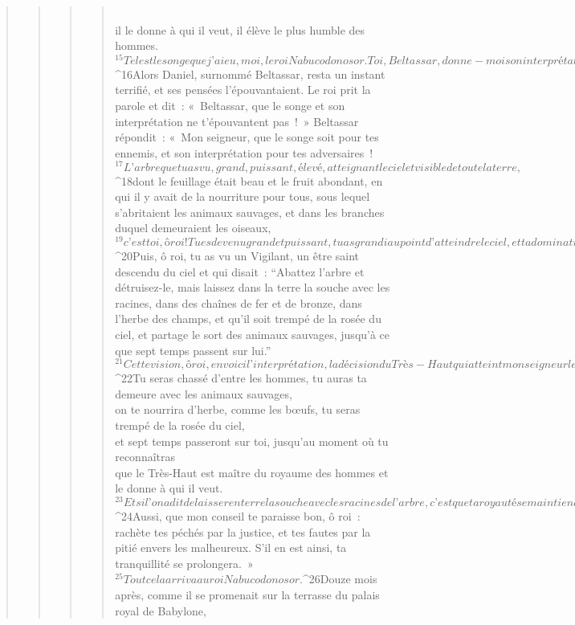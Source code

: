 \begin{verse}
\begin{verse}
\begin{verse}
\begin{verse}
        \\il le donne à qui il veut,
        il élève le plus humble des hommes.
${}^{15}Tel est le songe que j’ai eu, moi, le roi Nabucodonosor. Toi, Beltassar, donne-moi son interprétation, car aucun des sages de mon royaume n’a pu m’en faire connaître l’interprétation. Mais toi, tu le peux, puisque l’esprit des dieux saints est en toi. »
       
${}^{16}Alors Daniel, surnommé Beltassar, resta un instant terrifié, et ses pensées l’épouvantaient. Le roi prit la parole et dit : « Beltassar, que le songe et son interprétation ne t’épouvantent pas ! » Beltassar répondit : « Mon seigneur, que le songe soit pour tes ennemis, et son interprétation pour tes adversaires ! 
${}^{17}L’arbre que tu as vu, grand, puissant, élevé, atteignant le ciel et visible de toute la terre, 
${}^{18}dont le feuillage était beau et le fruit abondant, en qui il y avait de la nourriture pour tous, sous lequel s’abritaient les animaux sauvages, et dans les branches duquel demeuraient les oiseaux, 
${}^{19}c’est toi, ô roi ! Tu es devenu grand et puissant, tu as grandi au point d’atteindre le ciel, et ta domination s’étend jusqu’aux extrémités de la terre.
${}^{20}Puis, ô roi, tu as vu un Vigilant, un être saint descendu du ciel et qui disait : “Abattez l’arbre et détruisez-le, mais laissez dans la terre la souche avec les racines, dans des chaînes de fer et de bronze, dans l’herbe des champs, et qu’il soit trempé de la rosée du ciel, et partage le sort des animaux sauvages, jusqu’à ce que sept temps passent sur lui.” 
${}^{21}Cette vision, ô roi, en voici l’interprétation, la décision du Très-Haut qui atteint mon seigneur le roi :
${}^{22}Tu seras chassé d’entre les hommes,
        tu auras ta demeure avec les animaux sauvages,
        \\on te nourrira d’herbe, comme les bœufs,
        tu seras trempé de la rosée du ciel,
        \\et sept temps passeront sur toi,
        jusqu’au moment où tu reconnaîtras
        \\que le Très-Haut est maître du royaume des hommes
        et le donne à qui il veut.
${}^{23}Et si l’on a dit de laisser en terre la souche avec les racines de l’arbre, c’est que ta royauté se maintiendra quand tu auras reconnu que le Ciel est le maître. 
${}^{24}Aussi, que mon conseil te paraisse bon, ô roi : rachète tes péchés par la justice, et tes fautes par la pitié envers les malheureux. S’il en est ainsi, ta tranquillité se prolongera. »
       
${}^{25}Tout cela arriva au roi Nabucodonosor. 
${}^{26}Douze mois après, comme il se promenait sur la terrasse du palais royal de Babylone, 

\end{verse}
\end{verse}
\end{verse}
\end{verse}
